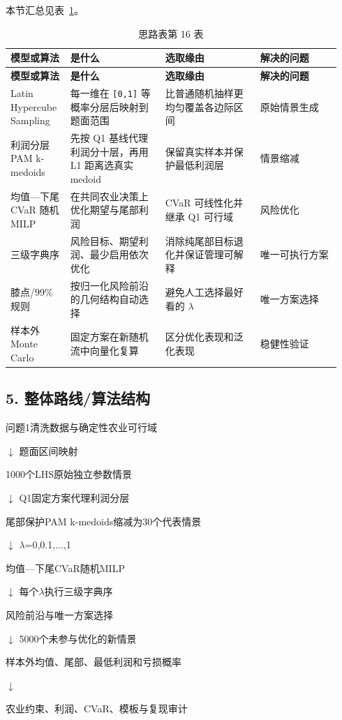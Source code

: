 \documentclass[UTF8,11pt,a4paper]{ctexart}
\begin{document}
\noindent 本节汇总见表~\ref{tab:thought-16}。
\begin{longtable}{@{}>{\raggedright\arraybackslash}p{0.17\linewidth}>{\raggedright\arraybackslash}p{0.27\linewidth}>{\raggedright\arraybackslash}p{0.27\linewidth}>{\raggedright\arraybackslash}p{0.23\linewidth}@{}}
\caption{思路表第 16 表}\label{tab:thought-16}\\
\toprule
\textbf{模型或算法} & \textbf{是什么} & \textbf{选取缘由} & \textbf{解决的问题} \\
\midrule
\endfirsthead
\toprule
\textbf{模型或算法} & \textbf{是什么} & \textbf{选取缘由} & \textbf{解决的问题} \\
\midrule
\endhead
Latin Hypercube Sampling & 每一维在 \texttt{[0,1]} 等概率分层后映射到题面范围 & 比普通随机抽样更均匀覆盖各边际区间 & 原始情景生成 \\
利润分层 PAM k-medoids & 先按 Q1 基线代理利润分十层，再用 L1 距离选真实 medoid & 保留真实样本并保护最低利润层 & 情景缩减 \\
均值—下尾 CVaR 随机 MILP & 在共同农业决策上优化期望与尾部利润 & CVaR 可线性化并继承 Q1 可行域 & 风险优化 \\
三级字典序 & 风险目标、期望利润、最少启用依次优化 & 消除纯尾部目标退化并保证管理可解释 & 唯一可执行方案 \\
膝点/99\%规则 & 按归一化风险前沿的几何结构自动选择 & 避免人工选择最好看的 \(\lambda{}\) & 唯一方案选择 \\
样本外 Monte Carlo & 固定方案在新随机流中向量化复算 & 区分优化表现和泛化表现 & 稳健性验证 \\
\bottomrule
\end{longtable}

\subsection{5. 整体路线/算法结构}

\begin{center}
\begin{minipage}{0.78\linewidth}
\small\raggedright
问题1清洗数据与确定性农业可行域\par
        \ensuremath{\downarrow} 题面区间映射\par
1000个LHS原始独立参数情景\par
        \ensuremath{\downarrow} Q1固定方案代理利润分层\par
尾部保护PAM k-medoids缩减为30个代表情景\par
        \ensuremath{\downarrow} \ensuremath{\lambda{}}=0,0.1,...,1\par
均值—下尾CVaR随机MILP\par
        \ensuremath{\downarrow} 每个\ensuremath{\lambda{}}执行三级字典序\par
风险前沿与唯一方案选择\par
        \ensuremath{\downarrow} 5000个未参与优化的新情景\par
样本外均值、尾部、最低利润和亏损概率\par
        \ensuremath{\downarrow}\par
农业约束、利润、CVaR、模板与复现审计\par
\end{minipage}
\end{center}
\end{document}
